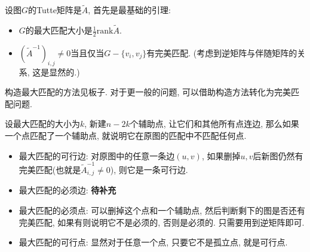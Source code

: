 设图$G$的Tutte矩阵是$\tilde A$, 首先是最基础的引理:

\begin{itemize}
	\item $G$的最大匹配大小是$\frac 1 2 \text{rank}{\tilde A}$.
	
	\item $({\tilde A} ^{-1}) _{i, j} \ne 0$当且仅当$G-\{v_i, v_j\}$有完美匹配.
		\subitem (考虑到逆矩阵与伴随矩阵的关系, 这是显然的.)
\end{itemize}

构造最大匹配的方法见板子. 对于更一般的问题, 可以借助构造方法转化为完美匹配问题.

设最大匹配的大小为$k$, 新建$n - 2 k$个辅助点, 让它们和其他所有点连边, 那么如果一个点匹配了一个辅助点, 就说明它在原图的匹配中不匹配任何点.

\begin{itemize}
	\item 最大匹配的可行边: 对原图中的任意一条边$(u, v)$, 如果删掉$u, v$后新图仍然有完美匹配(也就是${\tilde A} ^ {-1}_{i, j} \ne 0$), 则它是一条可行边.
	
	\item 最大匹配的必须边: \textbf{待补充}
	
	\item 最大匹配的必须点: 可以删掉这个点和一个辅助点, 然后判断剩下的图是否还有完美匹配, 如果有则说明它不是必须的, 否则是必须的. 只需要用到逆矩阵即可.
	
	\item 最大匹配的可行点: 显然对于任意一个点, 只要它不是孤立点, 就是可行点.
\end{itemize}